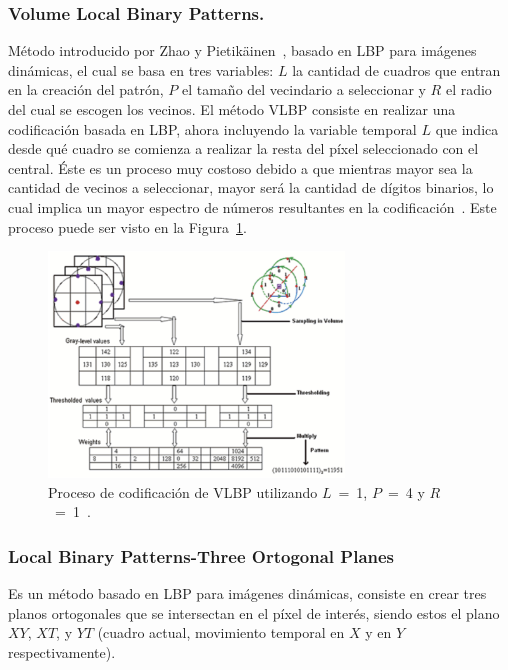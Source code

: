 		\subsubsection{Volume Local Binary Patterns.}
		\label{sec:vlbp}
		Método introducido por Zhao y Pietikäinen~\cite{Zhao2006}, basado en LBP para imágenes dinámicas, el cual se basa en tres variables: $L$ la cantidad de cuadros que entran en la creación del patrón, $P$ el tamaño del vecindario a seleccionar y $R$ el radio del cual se escogen los vecinos. 
El método VLBP consiste en realizar una codificación basada en LBP, ahora incluyendo la variable temporal $L$ que indica desde qué cuadro se comienza a realizar la resta del píxel seleccionado con el central.
Éste es un proceso muy costoso debido a que mientras mayor sea la cantidad de vecinos a seleccionar, mayor será la cantidad de dígitos binarios, lo cual implica un mayor espectro de números resultantes en la codificación~\cite{Zhao2007a,Zhao2007}. Este proceso puede ser visto en la Figura~\ref{art:fig:vlbp}.

\begin{figure}[tb]
  \centering
   \includegraphics[width=0.7\textwidth]{Figuras/vlbp.pdf}
  \caption{Proceso de codificación de VLBP utilizando $L$~=~1, $P$~=~4 y $R$~=~1~\cite{Zhao2007}.}
  \label{art:fig:vlbp}
\end{figure}


		\subsubsection{Local Binary Patterns-Three Ortogonal Planes}
		\label{sec:lbp-top}
		 Es un método basado en LBP para imágenes dinámicas, consiste en crear tres planos ortogonales que se intersectan en el píxel de interés, siendo estos el plano $XY$, $XT$, y $YT$ (cuadro actual, movimiento temporal en $X$ y en $Y$ respectivamente). 

